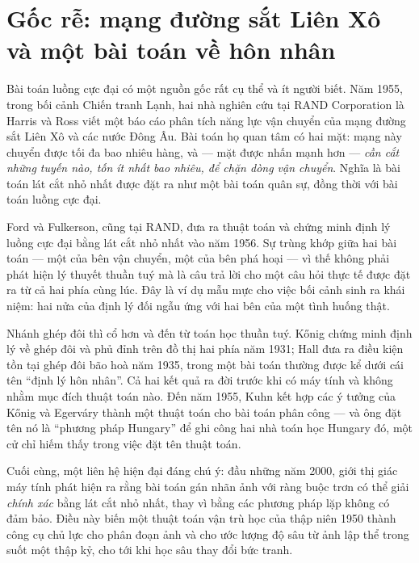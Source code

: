 \documentclass[../../algorithm.tex]{subfiles}
\begin{document}
\section{Gốc rễ: mạng đường sắt Liên Xô và một bài toán về hôn nhân}

Bài toán luồng cực đại có một nguồn gốc rất cụ thể và ít người biết. Năm 1955, trong bối cảnh Chiến tranh Lạnh, hai nhà nghiên cứu tại RAND Corporation là Harris và Ross viết một báo cáo phân tích năng lực vận chuyển của mạng đường sắt Liên Xô và các nước Đông Âu. Bài toán họ quan tâm có hai mặt: mạng này chuyển được tối đa bao nhiêu hàng, và --- mặt được nhấn mạnh hơn --- \emph{cần cắt những tuyến nào, tốn ít nhất bao nhiêu, để chặn dòng vận chuyển}. Nghĩa là bài toán lát cắt nhỏ nhất được đặt ra như một bài toán quân sự, đồng thời với bài toán luồng cực đại.

Ford và Fulkerson, cũng tại RAND, đưa ra thuật toán và chứng minh định lý luồng cực đại bằng lát cắt nhỏ nhất vào năm 1956. Sự trùng khớp giữa hai bài toán --- một của bên vận chuyển, một của bên phá hoại --- vì thế không phải phát hiện lý thuyết thuần tuý mà là câu trả lời cho một câu hỏi thực tế được đặt ra từ cả hai phía cùng lúc. Đây là ví dụ mẫu mực cho việc bối cảnh sinh ra khái niệm: hai nửa của định lý đối ngẫu ứng với hai bên của một tình huống thật.

Nhánh ghép đôi thì cổ hơn và đến từ toán học thuần tuý. Kőnig chứng minh định lý về ghép đôi và phủ đỉnh trên đồ thị hai phía năm 1931; Hall đưa ra điều kiện tồn tại ghép đôi bão hoà năm 1935, trong một bài toán thường được kể dưới cái tên ``định lý hôn nhân''. Cả hai kết quả ra đời trước khi có máy tính và không nhằm mục đích thuật toán nào. Đến năm 1955, Kuhn kết hợp các ý tưởng của Kőnig và Egerváry thành một thuật toán cho bài toán phân công --- và ông đặt tên nó là ``phương pháp Hungary'' để ghi công hai nhà toán học Hungary đó\cite{kuhn1955}, một cử chỉ hiếm thấy trong việc đặt tên thuật toán.

Cuối cùng, một liên hệ hiện đại đáng chú ý: đầu những năm 2000, giới thị giác máy tính phát hiện ra rằng bài toán gán nhãn ảnh với ràng buộc trơn có thể giải \emph{chính xác} bằng lát cắt nhỏ nhất, thay vì bằng các phương pháp lặp không có đảm bảo. Điều này biến một thuật toán vận trù học của thập niên 1950 thành công cụ chủ lực cho phân đoạn ảnh và cho ước lượng độ sâu từ ảnh lập thể trong suốt một thập kỷ, cho tới khi học sâu thay đổi bức tranh.
\end{document}
